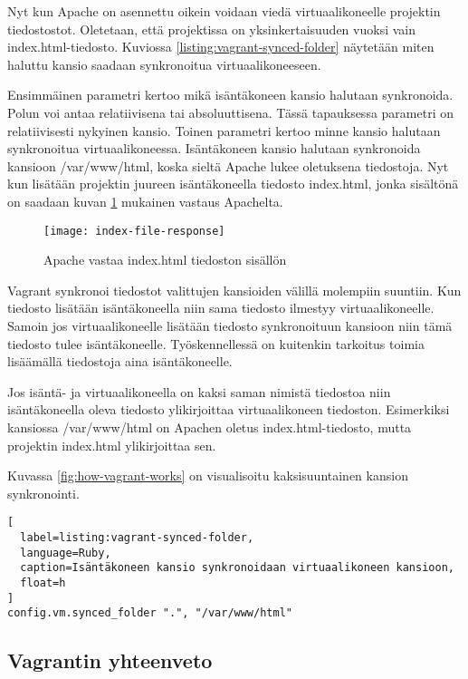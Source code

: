 Nyt kun Apache on asennettu oikein voidaan viedä virtuaalikoneelle projektin tiedostostot. Oletetaan, että projektissa on yksinkertaisuuden vuoksi vain index.html-tiedosto. Kuviossa \ref{listing:vagrant-synced-folder} näytetään miten haluttu kansio saadaan synkronoitua virtuaalikoneeseen.

Ensimmäinen parametri kertoo mikä isäntäkoneen kansio halutaan synkronoida. Polun voi antaa relatiivisena tai absoluuttisena. Tässä tapauksessa parametri on relatiivisesti nykyinen kansio. Toinen parametri kertoo minne kansio halutaan synkronoitua virtuaalikoneessa. Isäntäkoneen kansio halutaan synkronoida kansioon /var/www/html, koska sieltä Apache lukee oletuksena tiedostoja. Nyt kun lisätään projektin juureen isäntäkoneella tiedosto index.html, jonka sisältönä on  saadaan kuvan \ref{fig:index-file-response} mukainen vastaus Apachelta.

\begin{figure}[h]
  \texttt{[image: index-file-response]}
  \caption{Apache vastaa index.html tiedoston sisällön}
  \label{fig:index-file-response}
\end{figure}

Vagrant synkronoi tiedostot valittujen kansioiden välillä molempiin suuntiin. Kun tiedosto lisätään isäntäkoneella niin sama tiedosto ilmestyy virtuaalikoneelle. Samoin jos virtuaalikoneelle lisätään tiedosto synkronoituun kansioon niin tämä tiedosto tulee isäntäkoneelle. Työskennellessä on kuitenkin tarkoitus toimia lisäämällä tiedostoja aina isäntäkoneelle.


Jos isäntä- ja virtuaalikoneella on kaksi saman nimistä tiedostoa niin isäntäkoneella oleva tiedosto ylikirjoittaa virtuaalikoneen tiedoston. Esimerkiksi kansiossa /var/www/html on Apachen oletus index.html-tiedosto, mutta projektin index.html ylikirjoittaa sen.

Kuvassa \ref{fig:how-vagrant-works} on visualisoitu kaksisuuntainen kansion synkronointi.

\begin{lstlisting}[
  label=listing:vagrant-synced-folder,
  language=Ruby,
  caption=Isäntäkoneen kansio synkronoidaan virtuaalikoneen kansioon,
  float=h
]
config.vm.synced_folder ".", "/var/www/html"
\end{lstlisting}

\subsection{Vagrantin yhteenveto}

